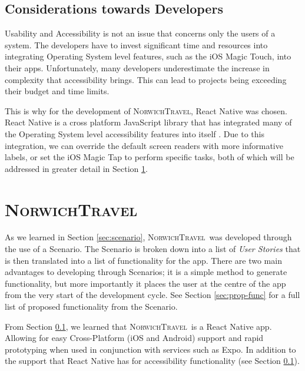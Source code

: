 \documentclass[cmpstyle]{ueacmpstyle}
\newcommand{\nt}{\textsc{NorwichTravel}}
\begin{document}
		\subsection{Considerations towards Developers} \label{sec:devcons}
		Usability and Accessibility is not an issue that concerns only the users of a system. The developers have to invest significant time and resources into integrating Operating System level features, such as the iOS Magic Touch, into their apps. Unfortunately, many developers underestimate the increase in complexity that accessibility brings. This can lead to projects being exceeding their budget and time limits.
		
		This is why for the development of \nt, React Native was chosen. React Native is a cross platform JavaScript library that has integrated many of the Operating System level accessibility features into itself \citep{reactAccess}. Due to this integration, we can override the default screen readers with more informative labels, or set the iOS Magic Tap to perform specific tasks, both of which will be addressed in greater detail in Section \ref{sec:nortrav}.
		
	\section{\nt} \label{sec:nortrav}
	As we learned in Section \ref{sec:scenario}, \nt \ was developed through the use of a Scenario. The Scenario is broken down into a list of \textit{User Stories} that is then translated into a list of functionality for the app. There are two main advantages to developing through Scenarios; it is a simple method to generate functionality, but more importantly it places the user at the centre of the app from the very start of the development cycle. See Section \ref{sec:prop-func} for a full list of proposed functionality from the Scenario.
	
	From Section \ref{sec:devcons}, we learned that \nt \ is a React Native app. Allowing for easy Cross-Platform (iOS and Android) support and rapid prototyping when used in conjunction with services such as Expo. In addition to the support that React Native has for accessibility functionality (see Section \ref{sec:devcons}).
	
\end{document}
